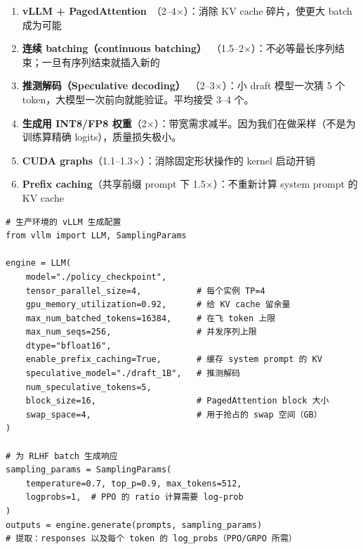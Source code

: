 \begin{enumerate}
  \item \textbf{vLLM + PagedAttention}~\cite{kwon2023efficient}（2--4$\times$）：消除 KV cache 碎片，使更大 batch 成为可能
  \item \textbf{连续 batching（continuous batching）}~\cite{yu2022orca}（1.5--2$\times$）：不必等最长序列结束；一旦有序列结束就插入新的
  \item \textbf{推测解码（Speculative decoding）}~\cite{leviathan2023fast}（2--3$\times$）：小 draft 模型一次猜 5 个 token，大模型一次前向就能验证。平均接受 3--4 个。
  \item \textbf{生成用 INT8/FP8 权重}（2$\times$）：带宽需求减半。因为我们在做采样（不是为训练算精确 logits），质量损失极小。
  \item \textbf{CUDA graphs}（1.1--1.3$\times$）：消除固定形状操作的 kernel 启动开销
  \item \textbf{Prefix caching}（共享前缀 prompt 下 1.5$\times$）：不重新计算 system prompt 的 KV cache
\end{enumerate}

\begin{lstlisting}[style=pythonstyle]
# 生产环境的 vLLM 生成配置
from vllm import LLM, SamplingParams

engine = LLM(
    model="./policy_checkpoint",
    tensor_parallel_size=4,           # 每个实例 TP=4
    gpu_memory_utilization=0.92,      # 给 KV cache 留余量
    max_num_batched_tokens=16384,     # 在飞 token 上限
    max_num_seqs=256,                 # 并发序列上限
    dtype="bfloat16",
    enable_prefix_caching=True,       # 缓存 system prompt 的 KV
    speculative_model="./draft_1B",   # 推测解码
    num_speculative_tokens=5,
    block_size=16,                    # PagedAttention block 大小
    swap_space=4,                     # 用于抢占的 swap 空间（GB）
)

# 为 RLHF batch 生成响应
sampling_params = SamplingParams(
    temperature=0.7, top_p=0.9, max_tokens=512,
    logprobs=1,  # PPO 的 ratio 计算需要 log-prob
)
outputs = engine.generate(prompts, sampling_params)
# 提取：responses 以及每个 token 的 log_probs（PPO/GRPO 所需）
\end{lstlisting}

